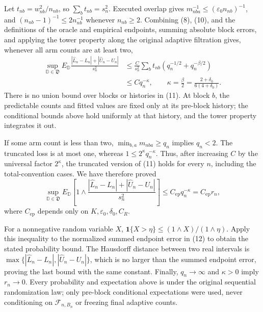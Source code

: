 Let \(t_{nb}=w_{nb}^2/n_{nb}\), so \(\sum_bt_{nb}=s_n^2\). Executed overlap gives \(m_{nba}^{-1}\le(\varepsilon_0n_{nb})^{-1}\), and \((n_{nb}-1)^{-1}\le2n_{nb}^{-1}\) whenever \(n_{nb}\ge2\). Combining (8), (10), and the definitions of the oracle and empirical endpoints, summing absolute block errors, and applying the tower property along the original adaptive filtration gives, whenever all arm counts are at least two,
\[
\begin{aligned}
\sup_{\mathbb D\in\mathfrak D}
E_{\mathbb D}\frac{|\widehat L_n-L_n|+|\widehat U_n-U_n|}{s_n^2}
&\le\frac{C}{s_n^2}\sum_bt_{nb}
\left(q_n^{-1/2}+q_n^{-\beta/2}\right)\\
&\le Cq_n^{-\kappa},
\qquad
\kappa=\frac\beta2=\frac{2+\delta_0}{6(4+\delta_0)}.
\end{aligned}
\tag{11}
\]
There is no union bound over blocks or histories in (11). At block \(b\), the predictable counts and fitted values are fixed only at its pre-block history; the conditional bounds above hold uniformly at that history, and the tower property integrates it out.

If some arm count is less than two, \(\min_{b,a}m_{nba}\ge q_n\) implies \(q_n<2\). The truncated loss is at most one, whereas
\(1\le2^\kappa q_n^{-\kappa}\). Thus, after increasing \(C\) by the universal factor \(2^\kappa\), the truncated version of (11) holds for every \(n\), including the total-convention cases. We have therefore proved
\[
\sup_{\mathbb D\in\mathfrak D}E_{\mathbb D}\left[1\wedge
\frac{|\widehat L_n-L_n|+|\widehat U_n-U_n|}{s_n^2}\right]
\le C_{\mathrm{ep}}q_n^{-\kappa}=C_{\mathrm{ep}}r_n,
\tag{12}
\]
where \(C_{\mathrm{ep}}\) depends only on \(K,\varepsilon_0,\delta_0,C_R\).

For a nonnegative random variable \(X\),
\(\mathbf1\{X>\eta\}\le(1\wedge X)/(1\wedge\eta)\). Apply this inequality to the normalized summed endpoint error in (12) to obtain the stated probability bound. The Hausdorff distance between two real intervals is
\(\max\{|\widehat L_n-L_n|,|\widehat U_n-U_n|\}\), which is no larger than the summed endpoint error, proving the last bound with the same constant. Finally, \(q_n\to\infty\) and \(\kappa>0\) imply \(r_n\to0\). Every probability and expectation above is under the original sequential randomization law; only pre-block conditional expectations were used, never conditioning on \(\mathcal F_{n,B_n}\) or freezing final adaptive counts.